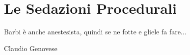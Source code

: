 \chapter{Le Sedazioni Procedurali}

\epigraph{Barbi è anche anestesista, quindi se ne fotte e gliele fa fare...}{Claudio Genovese}

\lipsum